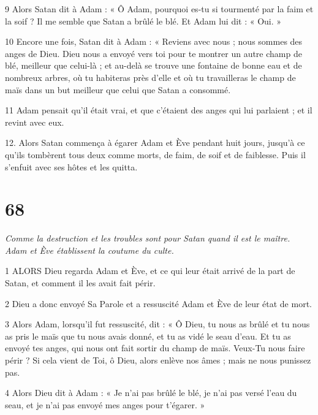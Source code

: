 \par 9 Alors Satan dit à Adam : « Ô Adam, pourquoi es-tu si tourmenté par la faim et la soif ? Il me semble que Satan a brûlé le blé. Et Adam lui dit : « Oui. »

\par 10 Encore une fois, Satan dit à Adam : « Reviens avec nous ; nous sommes des anges de Dieu. Dieu nous a envoyé vers toi pour te montrer un autre champ de blé, meilleur que celui-là ; et au-delà se trouve une fontaine de bonne eau et de nombreux arbres, où tu habiteras près d'elle et où tu travailleras le champ de maïs dans un but meilleur que celui que Satan a consommé.

\par 11 Adam pensait qu'il était vrai, et que c'étaient des anges qui lui parlaient ; et il revint avec eux.

\par 12. Alors Satan commença à égarer Adam et Ève pendant huit jours, jusqu'à ce qu'ils tombèrent tous deux comme morts, de faim, de soif et de faiblesse. Puis il s'enfuit avec ses hôtes et les quitta.

\chapter{68}

\par \textit{Comme la destruction et les troubles sont pour Satan quand il est le maître. Adam et Ève établissent la coutume du culte.}

\par 1 ALORS Dieu regarda Adam et Ève, et ce qui leur était arrivé de la part de Satan, et comment il les avait fait périr.

\par 2 Dieu a donc envoyé Sa Parole et a ressuscité Adam et Ève de leur état de mort.

\par 3 Alors Adam, lorsqu'il fut ressuscité, dit : « Ô Dieu, tu nous as brûlé et tu nous as pris le maïs que tu nous avais donné, et tu as vidé le seau d'eau. Et tu as envoyé tes anges, qui nous ont fait sortir du champ de maïs. Veux-Tu nous faire périr ? Si cela vient de Toi, ô Dieu, alors enlève nos âmes ; mais ne nous punissez pas.

\par 4 Alors Dieu dit à Adam : « Je n'ai pas brûlé le blé, je n'ai pas versé l'eau du seau, et je n'ai pas envoyé mes anges pour t'égarer. »

